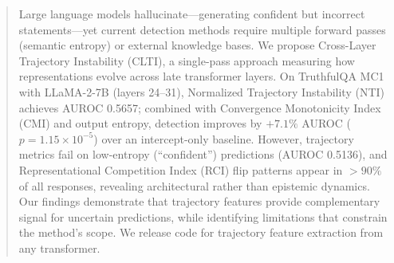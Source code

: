 \begin{abstract}
Large language models hallucinate---generating confident but incorrect statements---yet current detection methods require multiple forward passes (semantic entropy) or external knowledge bases. We propose Cross-Layer Trajectory Instability (CLTI), a single-pass approach measuring how representations evolve across late transformer layers. On TruthfulQA MC1 with LLaMA-2-7B (layers 24--31), Normalized Trajectory Instability (NTI) achieves AUROC 0.5657; combined with Convergence Monotonicity Index (CMI) and output entropy, detection improves by $+7.1\%$ AUROC ($p = 1.15 \times 10^{-5}$) over an intercept-only baseline. However, trajectory metrics fail on low-entropy (``confident'') predictions (AUROC 0.5136), and Representational Competition Index (RCI) flip patterns appear in $>90\%$ of all responses, revealing architectural rather than epistemic dynamics. Our findings demonstrate that trajectory features provide complementary signal for uncertain predictions, while identifying limitations that constrain the method's scope. We release code for trajectory feature extraction from any transformer.
\end{abstract}
